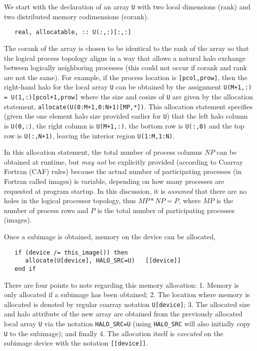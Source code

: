 We start with the declaration of an array \texttt{U} with two local dimensions (rank) and
two distributed memory codimensions (corank).
\begin{verbatim}
   real, allocatable, :: U(:,:)[:,:]
\end{verbatim}
The corank of the array is chosen to be identical to the rank of the array so that the logical
process topology aligns in a way that allows a natural halo exchange between logically neighboring
processes (this could not occur if corank and rank are not the same).  For example, if the process
location is \texttt{[pcol,prow]}, then the right-hand halo for the local array \texttt{U} can be
obtained by the assignment
\texttt{U(M+1,:) = U(1,:)[pcol+1,prow]} where the size and cosize of
\texttt{U} are given by the allocation statement,
\texttt{allocate(U(0:M+1,0:N+1)[MP,*])}.
This allocation statement specifies (given the one element halo size provided earlier for
\texttt{U}) that the left halo column is \texttt{U(0,:)}, the right column is \texttt{U(M+1,:)},
the bottom row is \texttt{U(:,0)} and the top row is \texttt{U(:,N+1)}, leaving the interior region
\texttt{U(1:M,1:N)}.

In this allocation statement, the total number of process columns $NP$ can be obtained at runtime,
but \emph{may not} be explicitly provided (according to Coarray Fortran (CAF) rules) because the actual number of
participating processes (in Fortran called images) is variable, depending on how many processes are
requested at program startup.  In this discussion, it is \emph{assumed} that there are no holes in
the logical processor topology, thus $MP*NP = P$, where $MP$ is the number of process rows and $P$
is the total number of participating processes (images).

Once a subimage is obtained, memory on the device can be allocated,
\begin{verbatim}
   if (device /= this_image()) then
      allocate(U[device], HALO_SRC=U)   [[device]]
   end if
\end{verbatim}
There are four points to note regarding this memory allocation: 1. Memory is only allocated if a
subimage has been obtained; 2. The location where memory is allocated is denoted by regular coarray
notation \texttt{U[device]}; 3. The allocated size and halo attribute of the new array are obtained
from the previously allocated local array \texttt{U} via the notation \texttt{HALO\_SRC=U} (using
\texttt{HALO\_SRC} will also initially copy \texttt{U} to the subimage); and finally 4. The
allocation itself is \emph{executed} on the subimage device with the notation \texttt{[[device]]}.

